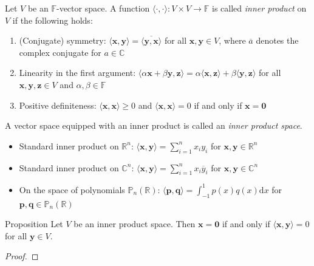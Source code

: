 \documentclass [aspectratio=169]{beamer}
\newcommand{\bx}{{\mathbf{x}}}
\newcommand{\by}{{\mathbf{y}}}
\newcommand{\bz}{{\mathbf{z}}}
\newcommand{\zerovec}{{\mathbf{0}}}
\newcommand{\innerprod}[1]{\langle #1 \rangle}
\newcommand{\R}{{\mathbb{R}}}
\newcommand{\C}{{\mathbb{C}}}
\newcommand{\F}{{\mathbb{F}}}
\begin{document}
\begin{frame}
\begin{definition}
Let $V$ be an $\F$-vector space. A function $\innerprod{\cdot,\cdot} \colon V \times V \to \F$ is called \emph{inner product} on $V$ if the following holds:
\begin{enumerate}
    \item (Conjugate) symmetry: $\innerprod{\bx,\by} = \overline{\innerprod{\by,\bx}}$ for all $\bx,\by\in V$, where $\overline{a}$ denotes the complex conjugate for $a\in \C$
    \item Linearity in the first argument: $\innerprod{\alpha \bx + \beta \by, \bz} = \alpha \innerprod{\bx,\bz} + \beta \innerprod{\by,\bz}$ for all $\bx,\by,\bz\in V$ and $\alpha, \beta \in \F$
    \item Positive definiteness: $\innerprod{\bx,\bx} \geq 0$ and $\innerprod{\bx,\bx} = 0$ if and only if $\bx = \zerovec$ 
\end{enumerate}
A vector space equipped with an inner product is called an \emph{inner product space}.
\end{definition}

\end{frame}


\begin{frame}
\begin{example}
\begin{itemize}
      \setlength\itemsep{1em}
    \item Standard inner product on $\R^n$: $\innerprod{\bx,\by }= \sum_{i=1}^n x_iy_i$ for $\bx,\by\in \R^n$
    \item Standard inner product on $\C^n$: $\innerprod{\bx,\by }= \sum_{i=1}^n x_i\overline{y}_i$ for $\bx,\by\in \C^n$
    \item On the space of polynomials $\mathbb{P}_n(\R)$: $\innerprod{\boldsymbol{p},\boldsymbol{q}} = \int_{-1}^1 p(x) {q}(x) \mathrm{d}x$ for $\boldsymbol{p},\boldsymbol{q}\in \mathbb{P}_n(\R)$
\end{itemize}
\end{example}

\end{frame}


\begin{frame}
\begin{exampleblock}{Proposition}
Let $V$ be an inner product space. Then $\bx = \zerovec$ if and only if $\innerprod{\bx,\by } = 0$ for all $\by \in V$.
\end{exampleblock}

\begin{proof}
\vspace{4cm}
\end{proof}
\end{frame}
\end{document}
